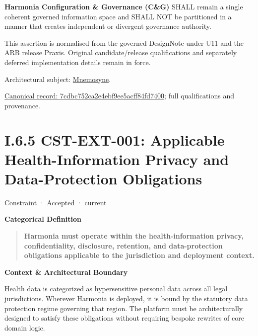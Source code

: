 \textbf{Harmonia Configuration \& Governance (C\&G)} SHALL remain a single coherent governed information space and SHALL NOT be partitioned in a manner that creates independent or divergent governance authority.



This assertion is normalised from the governed DesignNote under U11 and the ARB release Praxis. Original candidate/release qualifications and separately deferred implementation details remain in force.



Architectural subject: \hyperref[element:7985e647bf9e4ca3ba70faf9e3e4ae02]{Mnemosyne}.


{\footnotesize \href{../../../../continuum/motivation/constraint/7cdbc752ca2e4ebf9ee5acff84fd7400.md}{Canonical record: 7cdbc752ca2e4ebf9ee5acff84fd7400}; full qualifications and provenance.}\par
\section*{I.6.5 CST-EXT-001: Applicable Health-Information Privacy and Data-Protection Obligations}
\label{navigation:I.6.5}

\label{element:0ed6fb9fcc9547659ce76b917881274e}
{\small Constraint · Accepted · current}\par

\par\medskip\textbf{Categorical Definition}\par


\begin{quote}


\textbf{Harmonia must operate within the health-information privacy, confidentiality, disclosure, retention, and data-protection obligations applicable to the jurisdiction and deployment context.}



\end{quote}


\par\medskip\textbf{Context \& Architectural Boundary}\par


Health data is categorized as hypersensitive personal data across all legal jurisdictions. Wherever Harmonia is deployed, it is bound by the statutory data protection regime governing that region. The platform must be architecturally designed to satisfy these obligations without requiring bespoke rewrites of core domain logic.



